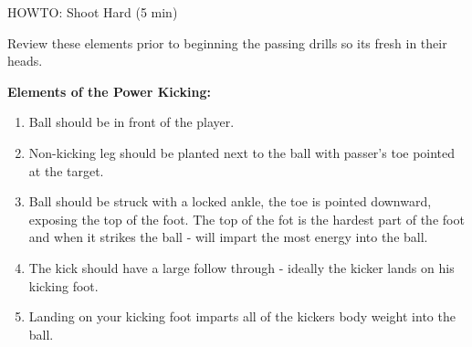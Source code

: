 \begin{evenBlock}{HOWTO:  Shoot Hard (5 min)}

\begin{minipage}[t]{\linewidth}
    \centering
    Review these elements prior to beginning the passing drills so its fresh in their heads.
    
    \textbf{Elements of the Power Kicking:}

    \begin{enumerate}
    \setlength{\itemsep}{0pt}
    \setlength{\parskip}{0pt}
    \setlength{\parsep}{0pt}
    \item Ball should be in front of the player.
    \item Non-kicking leg should be planted next to the ball with passer's toe pointed at the target.
    \item Ball should be struck with a locked ankle, the toe is pointed downward, exposing the top of the foot.  The top of the fot is the hardest part of the foot and when it strikes the ball - will impart the most energy into the ball.
    \item The kick should have a large follow through - ideally the kicker lands on his kicking foot.
    \item Landing on your kicking foot imparts all of the kickers body weight into the ball.
    \end{enumerate}
\end{minipage}

\end{evenBlock}